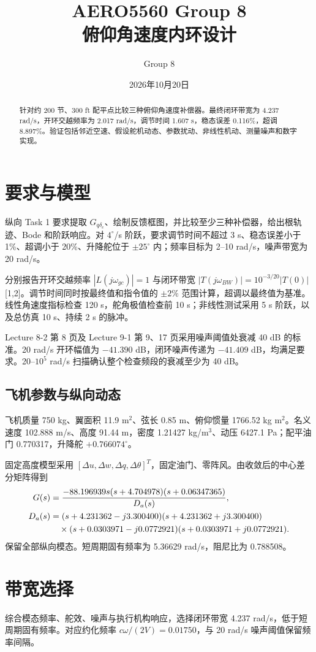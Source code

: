 \documentclass[UTF8,a4paper,11pt,fontset=windows]{ctexart}
\title{AERO5560 Group 8\\俯仰角速度内环设计}
\author{Group 8}\date{2026年10月20日}
\newcommand{\Gplant}{\frac{-88.196939s(s+4.704978)(s+0.06347365)}{D_a(s)}}
\begin{document}
\maketitle
\begin{abstract}
针对约 200 节、300 ft 配平点比较三种俯仰角速度补偿器。最终闭环带宽为 4.237 rad/s，开环交越频率为 2.017 rad/s，调节时间 1.607 s，稳态误差 0.116\%，超调 8.897\%。验证包括邻近空速、假设舵机动态、参数扰动、非线性机动、测量噪声和数字实现。
\end{abstract}
\tableofcontents\clearpage
\section{要求与模型}
纵向 Task 1 要求提取 $G_{q\delta_e}$、绘制反馈框图，并比较至少三种补偿器，给出根轨迹、Bode 和阶跃响应。对 $4^\circ$/s 阶跃，要求调节时间不超过 3 s、稳态误差小于 1\%、超调小于 20\%、升降舵位于 $\pm25^\circ$ 内；频率目标为 2--10 rad/s，噪声带宽为 20 rad/s。

分别报告开环交越频率 $|L(j\omega_{gc})|=1$ 与闭环带宽 $|T(j\omega_{BW})|=10^{-3/20}|T(0)|$ [1,2]。调节时间同时按最终值和指令值的 $\pm2\%$ 范围计算，超调以最终值为基准。线性角速度指标检查 120 s，舵角极值检查前 10 s；非线性测试采用 5 s 阶跃，以及总仿真 10 s、持续 2 s 的脉冲。

Lecture 8-2 第 8 页及 Lecture 9-1 第 9、17 页采用噪声阈值处衰减 40 dB 的标准。20 rad/s 开环幅值为 $-41.390$ dB，闭环噪声传递为 $-41.409$ dB，均满足要求。20--$10^5$ rad/s 扫描确认整个检查频段的衰减至少为 40 dB。

\subsection{飞机参数与纵向动态}
飞机质量 750 kg、翼面积 11.9 m$^2$、弦长 0.85 m、俯仰惯量 1766.52 kg m$^2$。名义速度 102.888 m/s、高度 91.44 m，密度 1.21427 kg/m$^3$、动压 6427.1 Pa；配平油门 0.770317，升降舵 $+0.766074^\circ$。

固定高度模型采用 $[\Delta u,\Delta w,\Delta q,\Delta\theta]^T$，固定油门、零阵风。由收敛后的中心差分矩阵得到
\begin{align}
G(s)&=\Gplant,\\
D_a(s)&=(s+4.231362-j3.300400)(s+4.231362+j3.300400)\notag\\
&\quad\times(s+0.0303971-j0.0772921)(s+0.0303971+j0.0772921).
\end{align}
保留全部纵向模态。短周期固有频率为 5.36629 rad/s，阻尼比为 0.788508。

\section{带宽选择}
综合模态频率、舵效、噪声与执行机构响应，选择闭环带宽 4.237 rad/s，低于短周期固有频率。对应约化频率 $c\omega/(2V)=0.01750$，与 20 rad/s 噪声阈值保留频率间隔。
\end{document}

